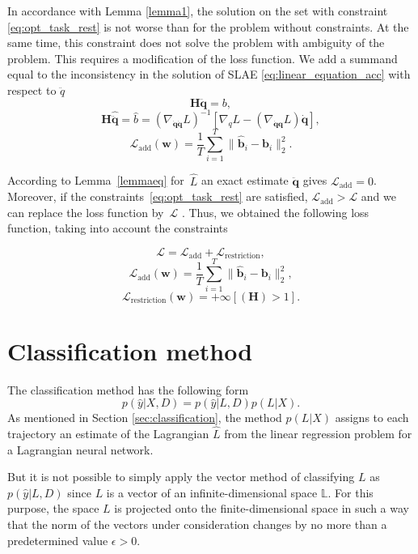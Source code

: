 \documentclass[12pt]{paper}
\begin{document}
In accordance with Lemma \ref{lemma1}, the solution on the set with constraint \eqref{eq:opt_task_rest} is not worse than for
the problem without constraints. At the same time, this constraint does not solve the problem with
ambiguity of the problem. This requires a modification of the loss function. We add a summand equal to the inconsistency in the solution of SLAE \eqref{eq:linear_equation_acc} with respect to $\ddot{q}$
\[\mathbf{H}\ddot{\mathbf{q}} = b,\]
 \[\mathbf{H}\hat{\ddot{\mathbf{q}}} = \hat{b} = \left(\nabla_{\dot{\mathbf{q}} \dot{\mathbf{q}}} L\right)^{-1}\left[\nabla_{q} L-\left(\nabla_{\dot{\mathbf{q}}\mathbf{q}} L\right) \dot{\mathbf{q}}\right], \]
\begin{equation}
    \mathcal{L}_{\text{add}}(\textbf{w}) = \frac{1}{T}\sum_{i=1}^{T} \| \mathbf{\hat{b}}_i - \mathbf{b}_i \|_2^2.
\end{equation}

According to Lemma~\ref{lemmaeq} for~$\hat{L}$ an exact estimate $\ddot{\mathbf{q}}$ gives $\mathcal{L}_\text{add} = 0$. Moreover, if the constraints~\eqref{eq:opt_task_rest} are satisfied, $\mathcal{L}_\text{add} > \mathcal{L}$ and we can replace the loss function by~$\mathcal{L}$ . Thus, we obtained the following loss function, taking into account the constraints

\begin{equation}
    \mathcal{L} = \mathcal{L}_\text{add} + \mathcal{L}_\text{restriction},
\end{equation}
\begin{equation}
    \mathcal{L}_\text{add}(\textbf{w}) = \frac{1}{T}\sum_{i=1}^{T} \| \mathbf{\hat{b}}_i - \mathbf{b}_i \|_2^2,
\end{equation}
\begin{equation}
    \mathcal{L}_\text{restriction}(\textbf{w}) = +\infty[\left(\mathbf{H}\right) > 1].
\end{equation}
\section{Classification method}
The classification method has the following form 
\[
p(\hat{y}|X, D) = p(\hat{y}|L, D)p(L|X).
\] 
As mentioned in Section \ref{sec:classification}, the method $p(L|X)$ assigns to each trajectory an estimate of the Lagrangian $\hat{L}$ from the linear regression problem for a Lagrangian neural network.

But it is not possible to simply apply the vector method of classifying $L$ as $p(\hat{y}|L, D)$ since $L$ is
a vector of an infinite-dimensional space $\mathbb{L}$. For this purpose, the space $L$ is projected onto the finite-dimensional space in such a way that the norm of the vectors under consideration changes by no more than a predetermined value $\epsilon > 0$.
\end{document}
